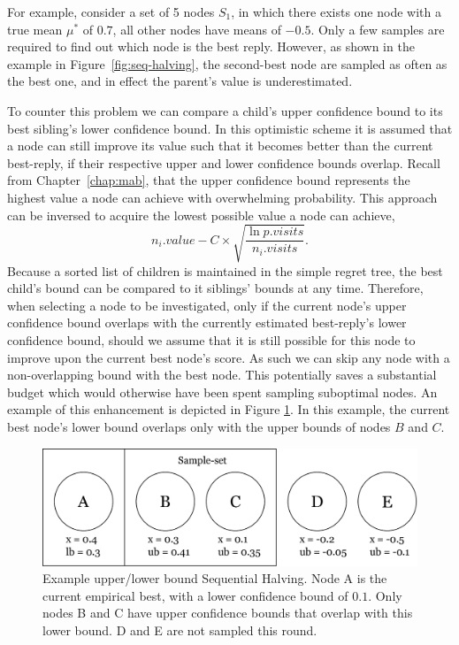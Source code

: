\documentclass{kecsmstr}
\begin{document}
For example, consider a set of 5 nodes $S_1$, in which there exists one node with a true mean $\mu^*$ of $0.7$, all other nodes have means of $-0.5$. Only a few samples are required to find out which node is the best reply. However, as shown in the example in Figure~\ref{fig:seq-halving}, the second-best node are sampled as often as the best one, and in effect the parent's value is underestimated. 

To counter this problem we can compare a child's upper confidence bound to its best sibling's lower confidence bound. In this optimistic scheme it is assumed that a node can still improve its value such that it becomes better than the current best-reply, if their respective upper and lower confidence bounds overlap. Recall from Chapter~\ref{chap:mab}, that the upper confidence bound represents the highest value a node can achieve with overwhelming probability. This approach can be inversed to acquire the lowest possible value a node can achieve,
\begin{equation}
  	n_i.value - C \times \displaystyle\sqrt{\frac{\ln{p.visits}}{n_i.visits}}.
\end{equation}
Because a sorted list of children is maintained in the simple regret tree, the best child's bound can be compared to it siblings' bounds at any time. Therefore, when selecting a node to be investigated, only if the current node's upper confidence bound overlaps with the currently estimated best-reply's lower confidence bound, should we assume that it is still possible for this node to improve upon the current best node's score. As such we can skip any node with a non-overlapping bound with the best node. This potentially saves a substantial budget which would otherwise have been spent sampling suboptimal nodes. An example of this enhancement is depicted in Figure \ref{fig:ublb}. In this example, the current best node's lower bound overlaps only with the upper bounds of nodes $B$ and $C$.

\begin{figure}[ht]
	\centering
	\includegraphics[width=.7\textwidth]{img/ublb.png}
	\caption{Example upper/lower bound Sequential Halving. Node A is the current empirical best, with a lower confidence bound of $0.1$. Only nodes B and C have upper confidence bounds that overlap with this lower bound. D and E are not sampled this round.}
	\label{fig:ublb}
\end{figure}
\end{document}
